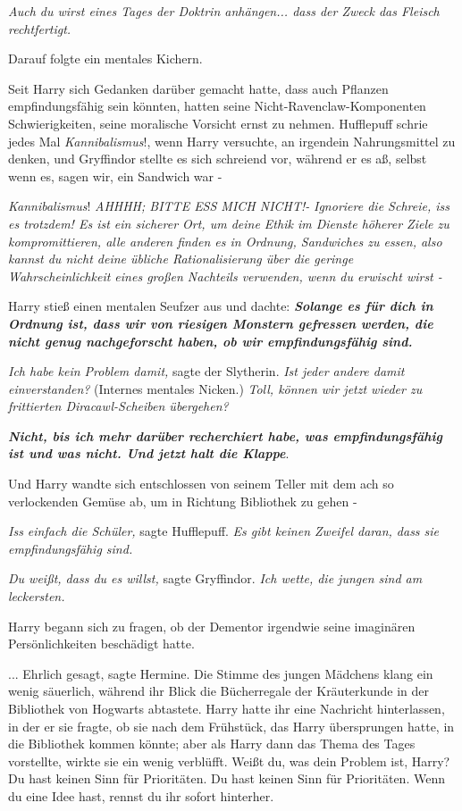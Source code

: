 \emph{Auch du wirst eines Tages der Doktrin anhängen... dass der Zweck das
Fleisch rechtfertigt.}

Darauf folgte ein mentales Kichern.

Seit Harry sich Gedanken darüber gemacht hatte, dass auch Pflanzen
empfindungsfähig sein könnten, hatten seine Nicht-Ravenclaw-Komponenten
Schwierigkeiten, seine moralische Vorsicht ernst zu nehmen. Hufflepuff schrie
jedes Mal \glqq{}\emph{Kannibalismus}!\grqq{}, wenn Harry versuchte, an irgendein
Nahrungsmittel zu denken, und Gryffindor stellte es sich schreiend vor, während
er es aß, selbst wenn es, sagen wir, ein Sandwich war -

\emph{Kannibalismus}!
\emph{AHHHH; BITTE ESS MICH NICHT!-}
\emph{Ignoriere die Schreie, iss es trotzdem! Es ist ein sicherer Ort, um deine
Ethik im Dienste höherer Ziele zu kompromittieren, alle anderen finden es in
Ordnung, Sandwiches zu essen, also kannst du nicht deine übliche
Rationalisierung über die geringe Wahrscheinlichkeit eines großen Nachteils
verwenden, wenn du erwischt wirst -}

Harry stieß einen mentalen Seufzer aus und dachte: \textbf{\emph{Solange es für
dich in Ordnung ist, dass wir von riesigen Monstern gefressen werden, die nicht
genug nachgeforscht haben, ob wir empfindungsfähig sind.} }

\emph{Ich habe kein Problem damit,} sagte der Slytherin. \emph{Ist jeder andere
damit einverstanden?} (Internes mentales Nicken.) \emph{Toll, können wir jetzt
wieder zu frittierten Diracawl-Scheiben übergehen?}

\textbf{\emph{Nicht, bis ich mehr darüber recherchiert habe, was
empfindungsfähig ist und was nicht. Und jetzt halt die Klappe}}.

Und Harry wandte sich entschlossen von seinem Teller mit dem ach so verlockenden
Gemüse ab, um in Richtung Bibliothek zu gehen -

\emph{Iss einfach die Schüler,} sagte Hufflepuff.
\emph{Es gibt keinen Zweifel daran, dass sie empfindungsfähig sind.}

\emph{Du weißt, dass du es willst,} sagte Gryffindor.
\emph{Ich wette, die jungen sind am leckersten.}

Harry begann sich zu fragen, ob der Dementor irgendwie seine imaginären
Persönlichkeiten beschädigt hatte.

... \glqq{}Ehrlich gesagt\grqq{}, sagte Hermine. Die Stimme des jungen Mädchens
klang ein wenig säuerlich, während ihr Blick die Bücherregale der Kräuterkunde
in der Bibliothek von Hogwarts abtastete. Harry hatte ihr eine Nachricht
hinterlassen, in der er sie fragte, ob sie nach dem Frühstück, das Harry
übersprungen hatte, in die Bibliothek kommen könnte; aber als Harry dann das
Thema des Tages vorstellte, wirkte sie ein wenig verblüfft. \glqq{}Weißt du, was
dein Problem ist, Harry? Du hast keinen Sinn für Prioritäten. Du hast keinen
Sinn für Prioritäten. Wenn du eine Idee hast, rennst du ihr sofort hinterher.\grqq{}

